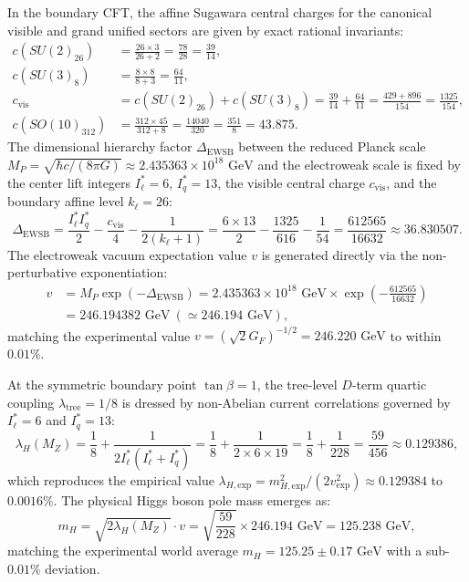 \documentclass[11pt,letterpaper]{article}
\theoremstyle{plain}
\begin{document}
In the boundary CFT, the affine Sugawara central charges for the canonical visible and grand unified sectors are given by exact rational invariants:
\begin{align}
c(SU(2)_{26}) &= \frac{26 \times 3}{26 + 2} = \frac{78}{28} = \frac{39}{14}, \\
c(SU(3)_8) &= \frac{8 \times 8}{8 + 3} = \frac{64}{11}, \\
c_{\mathrm{vis}} &= c(SU(2)_{26}) + c(SU(3)_8) = \frac{39}{14} + \frac{64}{11} = \frac{429 + 896}{154} = \frac{1325}{154}, \\
c(SO(10)_{312}) &= \frac{312 \times 45}{312 + 8} = \frac{14040}{320} = \frac{351}{8} = 43.875.
\end{align}
The dimensional hierarchy factor $\Delta_{\mathrm{EWSB}}$ between the reduced Planck scale $M_P = \sqrt{\hbar c / (8\pi G)} \approx 2.435363 \times 10^{18}\text{ GeV}$ and the electroweak scale is fixed by the center lift integers $I_\ell^* = 6$, $I_q^* = 13$, the visible central charge $c_{\mathrm{vis}}$, and the boundary affine level $k_\ell = 26$:
\begin{equation}
\Delta_{\mathrm{EWSB}} = \frac{I_\ell^* I_q^*}{2} - \frac{c_{\mathrm{vis}}}{4} - \frac{1}{2(k_\ell + 1)} = \frac{6 \times 13}{2} - \frac{1325}{616} - \frac{1}{54} = \frac{612565}{16632} \approx 36.830507.
\end{equation}
The electroweak vacuum expectation value $v$ is generated directly via the non-perturbative exponentiation:
\begin{equation}
\begin{aligned}
v &= M_P \exp\left( -\Delta_{\mathrm{EWSB}} \right) = 2.435363 \times 10^{18}\text{ GeV} \times \exp\left( -\frac{612565}{16632} \right) \\
&= 246.194382\text{ GeV}\ (\simeq 246.194\text{ GeV}),
\end{aligned}
\end{equation}
matching the experimental value $v = (\sqrt{2} G_F)^{-1/2} = 246.220\text{ GeV}$ to within $0.01\%$.

At the symmetric boundary point $\tan\beta = 1$, the tree-level $D$-term quartic coupling $\lambda_{\mathrm{tree}} = 1/8$ is dressed by non-Abelian current correlations governed by $I_\ell^* = 6$ and $I_q^* = 13$:
\begin{equation}
\lambda_H(M_Z) = \frac{1}{8} + \frac{1}{2 I_\ell^* (I_\ell^* + I_q^*)} = \frac{1}{8} + \frac{1}{2 \times 6 \times 19} = \frac{1}{8} + \frac{1}{228} = \frac{59}{456} \approx 0.129386,
\end{equation}
which reproduces the empirical value $\lambda_{H,\mathrm{exp}} = m_{H,\mathrm{exp}}^2 / (2 v_{\mathrm{exp}}^2) \approx 0.129384$ to $0.0016\%$. The physical Higgs boson pole mass emerges as:
\begin{equation}
m_H = \sqrt{2 \lambda_H(M_Z)} \cdot v = \sqrt{\frac{59}{228}} \times 246.194\text{ GeV} = 125.238\text{ GeV},
\end{equation}
matching the experimental world average $m_H = 125.25 \pm 0.17\text{ GeV}$ with a sub-$0.01\%$ deviation.
\end{document}
